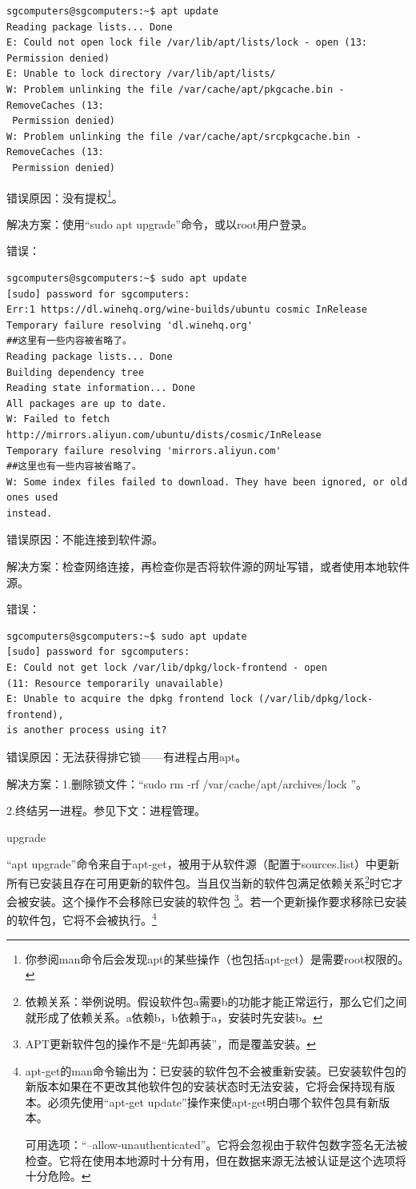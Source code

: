 \documentclass{book}
\begin{document}
\begin{verbatim}
sgcomputers@sgcomputers:~$ apt update
Reading package lists... Done
E: Could not open lock file /var/lib/apt/lists/lock - open (13: Permission denied)
E: Unable to lock directory /var/lib/apt/lists/
W: Problem unlinking the file /var/cache/apt/pkgcache.bin - RemoveCaches (13:
 Permission denied)
W: Problem unlinking the file /var/cache/apt/srcpkgcache.bin - RemoveCaches (13:
 Permission denied)
\end{verbatim}
错误原因：没有提权\footnote{你参阅man命令后会发现apt的某些操作（也包括apt-get）是需要root权限的。}。  \par
解决方案：使用“sudo apt upgrade”命令，或以root用户登录。  \par
\large 错误：\normalsize \par
\begin{verbatim}
sgcomputers@sgcomputers:~$ sudo apt update
[sudo] password for sgcomputers:
Err:1 https://dl.winehq.org/wine-builds/ubuntu cosmic InRelease
Temporary failure resolving 'dl.winehq.org'
##这里有一些内容被省略了。
Reading package lists... Done
Building dependency tree
Reading state information... Done
All packages are up to date.
W: Failed to fetch http://mirrors.aliyun.com/ubuntu/dists/cosmic/InRelease
Temporary failure resolving 'mirrors.aliyun.com'
##这里也有一些内容被省略了。
W: Some index files failed to download. They have been ignored, or old ones used
instead.
\end{verbatim}
错误原因：不能连接到软件源。 \par
解决方案：检查网络连接，再检查你是否将软件源的网址写错，或者使用本地软件源。 \par
\large 错误：\normalsize \par
\begin{verbatim}
sgcomputers@sgcomputers:~$ sudo apt update
[sudo] password for sgcomputers:
E: Could not get lock /var/lib/dpkg/lock-frontend - open 
(11: Resource temporarily unavailable)
E: Unable to acquire the dpkg frontend lock (/var/lib/dpkg/lock-frontend), 
is another process using it?
\end{verbatim}
错误原因：无法获得排它锁——有进程占用apt。\par
解决方案：1.删除锁文件：“sudo rm -rf /var/cache/apt/archives/lock ”。\par
2.终结另一进程。参见下文：进程管理。
\begin{center} upgrade \end{center}
“apt upgrade”命令来自于apt-get，被用于从软件源（配置于sources.list）中更新所有已安装且存在可用更新的软件包。当且仅当新的软件包满足依赖关系\footnote{依赖关系：举例说明。假设软件包a需要b的功能才能正常运行，那么它们之间就形成了依赖关系。a依赖b，b依赖于a，安装时先安装b。}时它才会被安装。这个操作不会移除已安装的软件包 \footnote{APT更新软件包的操作不是“先卸再装”，而是覆盖安装。}。若一个更新操作要求移除已安装的软件包，它将不会被执行。\footnote{apt-get的man命令输出为：已安装的软件包不会被重新安装。已安装软件包的新版本如果在不更改其他软件包的安装状态时无法安装，它将会保持现有版本。必须先使用“apt-get update”操作来使apt-get明白哪个软件包具有新版本。\par
可用选项：“--allow-unauthenticated”。它将会忽视由于软件包数字签名无法被检查。它将在使用本地源时十分有用，但在数据来源无法被认证是这个选项将十分危险。}
\end{document}
